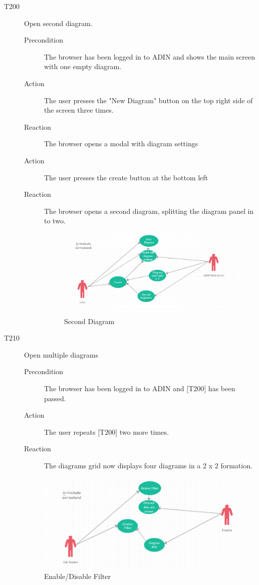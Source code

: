 \documentclass[twoside, english, draft]{Pflichtenheft}
\begin{document}
\begin{description}
  \item[T200] Open second diagram.
\begin{description}
    \item[Precondition]
    The browser has been logged in to ADIN and shows the main screen with one empty diagram.
    \item[Action]
    The user presses the "New Diagram" button on the top right side of the screen three times.
    \item[Reaction]
    The browser opens a modal with diagram settings
    \item[Action]
    The user presses the create button at the bottom left
    \item[Reaction]
    The browser opens a second diagram, splitting the diagram panel in to two.

 \begin{figure}
\centering
\includegraphics[width=\textwidth]{Images/second_diagram.png}
\caption{Second Diagram}
\end{figure}
\end{description}


  \item[T210] Open multiple diagrams
\begin{description}
    \item[Precondition]
    The browser has been logged in to ADIN and [T200] has been passed.
    \item[Action]
    The user repeats [T200] two more times.
    \item[Reaction]
    The diagrams grid now displays four diagrams in a 2 x 2 formation.

\end{description}
 \begin{figure}
\centering
\includegraphics[width=\textwidth]{Images/filter.png}
\caption{Enable/Disable Filter}
\end{figure}
 


\end{description}
\end{document}
